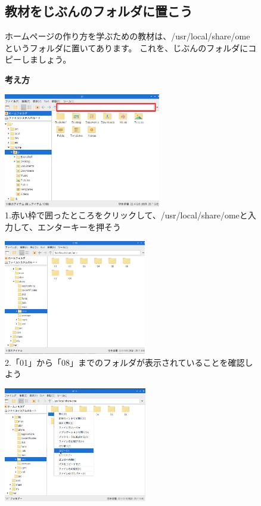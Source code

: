\documentclass[a4paper,12pt]{jarticle}
\begin{document}
\begin{figure}
\subsection{教材をじぶんのフォルダに置こう}
ホームページの作り方を学ぶための教材は、/usr/local/share/omeというフォルダに置いてあります。
これを、じぶんのフォルダにコピーしましょう。

\textbf{考え方}

  \bigskip

  \centering
  \begin{minipage}{\textwidth}
    \begin{minipage}{0.45\linewidth}
      \includegraphics[height=5cm]{textbook-img1010.png}\\
      1.赤い枠で囲ったところをクリックして、/usr/local/share/omeと入力して、エンターキーを押そう
    \end{minipage}
    \hfill
    \vspace{20pt}
    \begin{minipage}{0.45\linewidth}
      \includegraphics[height=5cm]{textbook-img1011.png}\\
      2.「01」から「08」までのフォルダが表示されていることを確認しよう
    \end{minipage}
    \begin{minipage}{0.45\linewidth}
      \includegraphics[height=5cm]{textbook-img1012.png}\\

\end{minipage}
\end{minipage}
\end{figure}
\end{document}

